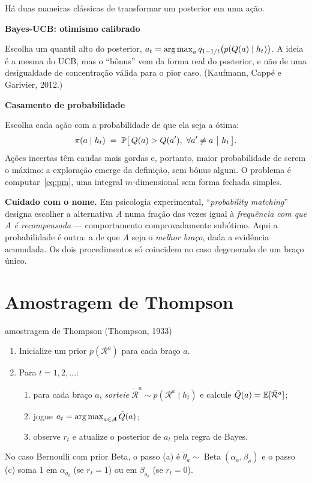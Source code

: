 \documentclass[11pt, a4paper]{article}
\newcommand{\Bdist}{\operatorname{Beta}}
\newcommand{\hist}{h_t}
\newcommand{\subt}[1]{\medskip\noindent\textbf{\color{rlAzulClaro}#1}\par\nobreak\smallskip}
\begin{document}
Há duas maneiras clássicas de transformar um posterior em uma ação.

\subt{Bayes-UCB: otimismo calibrado}
Escolha um quantil alto do posterior,
$a_t = \argmax_a q_{1-1/t}\big(p(Q(a)\mid \hist)\big)$. A ideia é a mesma do UCB,
mas o ``bônus'' vem da forma real do posterior, e não de uma desigualdade de
concentração válida para o pior caso. (Kaufmann, Cappé e Garivier, 2012.)

\subt{Casamento de probabilidade}
Escolha cada ação com a probabilidade de que ela seja a ótima:
\begin{equation}
  \pol(a \mid \hist) \;=\; \Prob\big[\,Q(a) > Q(a'),\ \forall a'\neq a \ \big|\ \hist\,\big].
  \label{eq:pm}
\end{equation}
Ações incertas têm caudas mais gordas e, portanto, maior probabilidade de serem
o máximo: a exploração emerge da definição, sem bônus algum. O problema é
computar~\eqref{eq:pm}, uma integral $m$-dimensional sem forma fechada simples.

\begin{alertabox}
\textbf{Cuidado com o nome.} Em psicologia experimental,
``\emph{probability matching}'' designa escolher a alternativa $A$ numa fração
das vezes igual à \emph{frequência com que $A$ é recompensada} — comportamento
comprovadamente subótimo. Aqui a probabilidade é outra: a de que $A$ seja o
\emph{melhor braço}, dada a evidência acumulada. Os dois procedimentos só
coincidem no caso degenerado de um braço único.
\end{alertabox}

\section{Amostragem de Thompson}

\begin{algbox}{amostragem de Thompson (Thompson, 1933)}
\begin{enumerate}[leftmargin=1.6em, itemsep=0.15em]
  \item Inicialize um prior $p(\mathcal{R}^a)$ para cada braço $a$.
  \item Para $t = 1, 2, \ldots$:
  \begin{enumerate}[leftmargin=1.4em, label=(\alph*), itemsep=0.1em]
    \item para cada braço $a$, \emph{sorteie}
          $\tilde{\mathcal{R}}^a \sim p(\mathcal{R}^a \mid \hist)$ e calcule
          $\tilde Q(a) = \mathbb{E}[\tilde{\mathcal{R}}^a]$;
    \item jogue $a_t = \operatorname*{arg\,max}_{a\in\mathcal{A}} \tilde Q(a)$;
    \item observe $r_t$ e atualize o posterior de $a_t$ pela regra de Bayes.
  \end{enumerate}
\end{enumerate}
No caso Bernoulli com prior Beta, o passo (a) é
$\tilde\theta_a \sim \Bdist(\alpha_a,\beta_a)$ e o passo (c) soma $1$ em
$\alpha_{a_t}$ (se $r_t=1$) ou em $\beta_{a_t}$ (se $r_t=0$).
\end{algbox}
\end{document}
